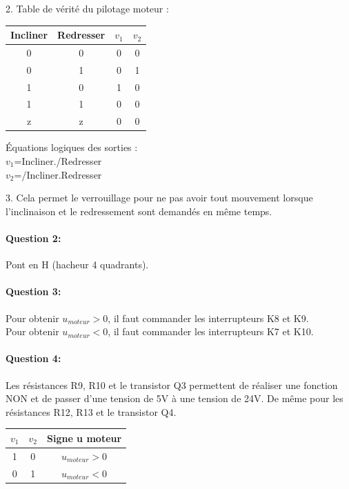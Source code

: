 2. Table de vérité du pilotage moteur :

\begin{center}
\begin{tabular}{|c|c|c|c|}
\hline
Incliner & Redresser & $v_1$ & $v_2$ \\
\hline
0 & 0 & 0 & 0 \\
\hline
0 & 1 & 0 & 1 \\
\hline
1 & 0 & 1 & 0 \\
\hline
1 & 1 & 0 & 0 \\
\hline
z & z & 0 & 0 \\
\hline
\end{tabular}
\end{center}

Équations logiques des sorties : \\
$v_1$=Incliner./Redresser \\
$v_2$=/Incliner.Redresser
 
3. Cela permet le verrouillage pour ne pas avoir tout mouvement lorsque l'inclinaison et le redressement sont demandés en même temps.

\paragraph{Question 2:} 
Pont en H (hacheur 4 quadrants).

\paragraph{Question 3:} 

Pour obtenir $u_{moteur}>0$, il faut commander les interrupteurs K8 et K9.\\
Pour obtenir $u_{moteur}<0$, il faut commander les interrupteurs K7 et K10.

\paragraph{Question 4:} 

Les résistances R9, R10 et le transistor Q3 permettent de réaliser une fonction NON et de passer d'une tension de 5V à une tension de 24V. De même pour les résistances R12, R13 et le transistor Q4.

\begin{center}
\begin{tabular}{|c|c|c|}
\hline
$v_1$ & $v_2$ & Signe u moteur\\
\hline
1 & 0 & $u_{moteur}>0$ \\
\hline
0 & 1 & $u_{moteur}<0$ \\
\hline
\end{tabular}
\end{center}

